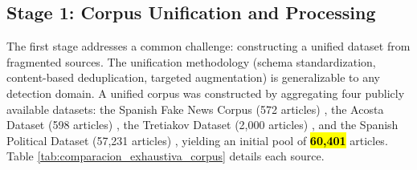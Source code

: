 \documentclass[informatics,article,accept,pdftex,moreauthors]{Definitions/mdpi}
\begin{document}
\subsection{Stage 1: Corpus Unification and Processing}
The first stage addresses a common challenge: constructing a unified dataset from fragmented sources. The unification methodology (schema standardization, content-based deduplication, targeted augmentation) is generalizable to any detection domain. A unified corpus was constructed by aggregating four publicly available datasets: the Spanish Fake News Corpus (572 articles) \citep{posadas2019detection}, the Acosta Dataset (598 articles) \citep{acosta2019construccion}, the Tretiakov Dataset (2,000 articles) \citep{tretiakov2022detection}, and the Spanish Political Dataset (57,231 articles) \citep{blanco2024enhancing}, yielding an initial pool of \textbf{\hl{60,401}} articles. Table \ref{tab:comparacion_exhaustiva_corpus} details each source.
\end{document}
